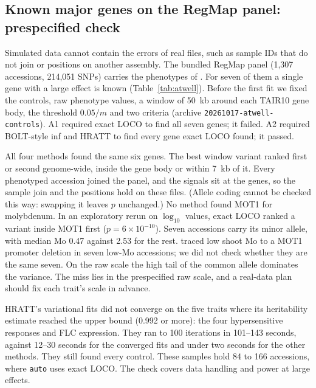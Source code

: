 \documentclass[11pt]{article}
\newcommand{\code}[1]{\texttt{#1}}
\begin{document}
\subsection{Known major genes on the RegMap panel: prespecified check}
\label{sec:atwell-results}

Simulated data cannot contain the errors of real files, such as sample
IDs that do not join or positions on another assembly. The
bundled RegMap panel (1,307 accessions, 214,051 SNPs) carries the
phenotypes of \citet{atwell2010}. For seven of them a single gene with a
large effect is known (Table~\ref{tab:atwell}). Before the first fit we
fixed the controls, raw phenotype values, a window of 50~kb around each
TAIR10 gene body, the threshold $0.05/m$ and two criteria (archive
\code{20261017-}\allowbreak\code{atwell-controls}). A1 required exact LOCO
to find all seven genes; it failed. A2 required BOLT-style inf and HRATT to
find every gene exact LOCO found; it passed.

All four methods found the same six genes. The best window variant ranked
first or second genome-wide, inside the gene body or within 7~kb of it.
Every phenotyped accession joined the panel, and the signals sit at the
genes, so the sample join and the positions hold on these files. (Allele
coding cannot be checked this way: swapping it leaves $p$ unchanged.) No method found MOT1
for molybdenum. In an exploratory rerun on $\log_{10}$ values, exact LOCO
ranked a variant inside MOT1 first ($p=6\times10^{-10}$). Seven
accessions carry its minor allele, with median Mo 0.47 against 2.53 for
the rest. \citet{baxter2008} traced low shoot Mo to a MOT1 promoter
deletion in seven low-Mo accessions; we did not check whether they are
the same seven. On the raw scale the high tail of the common allele
dominates the variance. The miss lies in the prespecified raw scale, and
a real-data plan should fix each trait's scale in advance.

HRATT's variational fits did not converge on the five traits where its
heritability estimate reached the upper bound (0.992 or more): the four
hypersensitive responses and FLC expression. They ran to 100 iterations
in 101--143 seconds, against 12--30 seconds for the converged fits and
under two seconds for the other methods. They still found every control.
These samples hold 84 to 166 accessions, where \code{auto} uses exact LOCO.
The check covers data handling and power at large effects.
\end{document}
